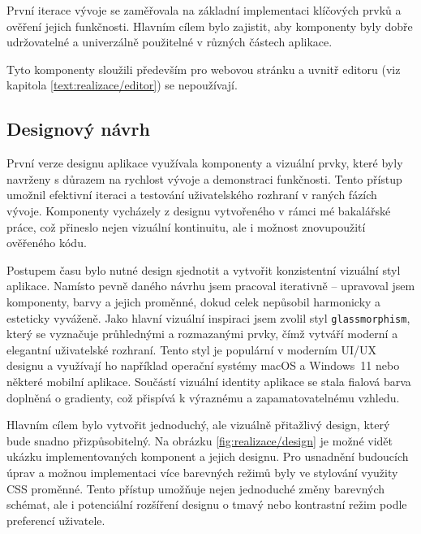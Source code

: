 První iterace vývoje se zaměřovala na základní implementaci klíčových prvků a ověření jejich funkčnosti. 
Hlavním cílem bylo zajistit, aby komponenty byly dobře udržovatelné a univerzálně použitelné v různých částech aplikace.

Tyto komponenty sloužili především pro webovou stránku a uvnitř editoru (viz kapitola \ref{text:realizace/editor}) se nepoužívají.


\subsection{Designový návrh}

První verze designu aplikace využívala komponenty a vizuální prvky, které byly navrženy s důrazem na rychlost vývoje a demonstraci funkčnosti. 
Tento přístup umožnil efektivní iteraci a testování uživatelského rozhraní v raných fázích vývoje.
Komponenty vycházely z designu vytvořeného v rámci mé bakalářské práce, což přineslo nejen vizuální kontinuitu, ale i možnost znovupoužití ověřeného kódu.

Postupem času bylo nutné design sjednotit a vytvořit konzistentní vizuální styl aplikace.
Namísto pevně daného návrhu jsem pracoval iterativně -- upravoval jsem komponenty, barvy a jejich proměnné, dokud celek nepůsobil harmonicky a esteticky vyváženě. 
Jako hlavní vizuální inspiraci jsem zvolil styl \texttt{glassmorphism}, který se vyznačuje průhlednými a rozmazanými prvky, čímž vytváří moderní a elegantní uživatelské rozhraní.
Tento styl je populární v moderním UI/UX designu a využívají ho například operační systémy macOS a Windows~11 nebo některé mobilní aplikace.
Součástí vizuální identity aplikace se stala fialová barva doplněná o gradienty, což přispívá k výraznému a zapamatovatelnému vzhledu.

Hlavním cílem bylo vytvořit jednoduchý, ale vizuálně přitažlivý design, který bude snadno přizpůsobitelný.
Na obrázku \ref{fig:realizace/design} je možné vidět ukázku implementovaných komponent a jejich designu.
Pro usnadnění budoucích úprav a možnou implementaci více barevných režimů byly ve stylování využity CSS proměnné.
Tento přístup umožňuje nejen jednoduché změny barevných schémat, ale i potenciální rozšíření designu o tmavý nebo kontrastní režim podle preferencí uživatele.



